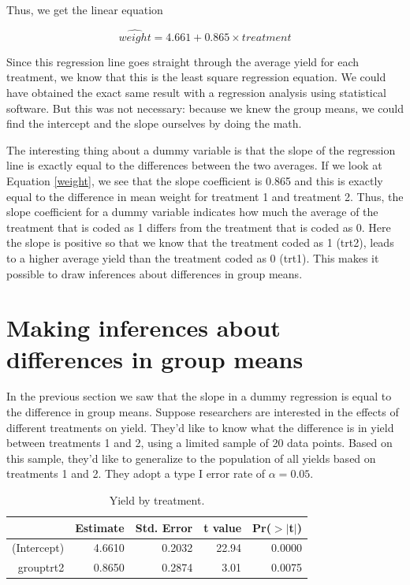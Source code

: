 \documentclass[]{book}\usepackage[]{graphicx}\usepackage[]{color}
\begin{document}
Thus, we get the linear equation 

\begin{equation}
\label{weight}
\widehat{weight} = 4.661 + 0.865\times treatment
\end{equation}

Since this regression line goes straight through the average yield for each treatment, we know that this is the least square regression equation. We could have obtained the exact same result with a regression analysis using statistical software. But this was not necessary: because we knew the group means, we could find the intercept and the slope ourselves by doing the math.  

The interesting thing about a dummy variable is that the slope of the regression line is exactly equal to the differences between the two averages. If we look at Equation \ref{weight}, we see that the slope coefficient is 0.865 and this is exactly equal to the difference in mean weight for treatment 1 and treatment 2. Thus, the slope coefficient for a dummy variable indicates how much the average of the treatment that is coded as 1 differs from the treatment that is coded as 0. Here the slope is positive so that we know that the treatment coded as 1 (trt2), leads to a higher average yield than the treatment coded as 0 (trt1). This makes it possible to draw inferences about differences in group means.

\section{Making inferences about differences in group means}

In the previous section we saw that the slope in a dummy regression is equal to the difference in group means. Suppose researchers are interested in the effects of different treatments on yield. They'd like to know what the difference is in yield between treatments 1 and 2, using a limited sample of 20 data points. Based on this sample, they'd like to generalize to the population of all yields based on treatments 1 and 2. They adopt a type I error rate of $\alpha=0.05$.


\begin{table}[ht]
\centering
\caption{Yield by treatment.} 
\label{tab:dummy_9}
\begin{tabular}{rrrrr}
  \hline
 & Estimate & Std. Error & t value & Pr($>$$|$t$|$) \\ 
  \hline
(Intercept) & 4.6610 & 0.2032 & 22.94 & 0.0000 \\ 
  grouptrt2 & 0.8650 & 0.2874 & 3.01 & 0.0075 \\ 
   \hline
\end{tabular}
\end{table}
\end{document}
